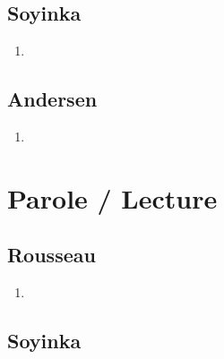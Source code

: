 \documentclass[a4paper, 11pt, hidelinks]{article}
\begin{document}
\subsection{Soyinka}


\begin{enumerate}
    \item 
\end{enumerate}




\subsection{Andersen}


\begin{enumerate}
    \item 
\end{enumerate}













































\section{Parole / Lecture}



\subsection{Rousseau}


\begin{enumerate}
    \item 
\end{enumerate}



\subsection{Soyinka}
\end{document}
